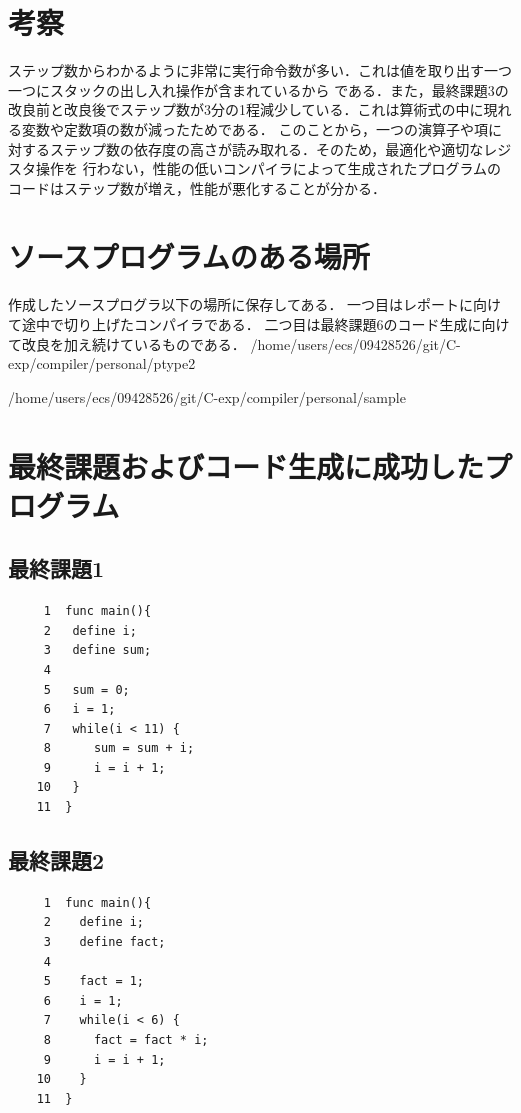 \documentclass[a4paper,11pt]{jarticle}
\begin{document}
{\begin{verbatim}
\end{verbatim}
\section{考察}
ステップ数からわかるように非常に実行命令数が多い．これは値を取り出す一つ一つにスタックの出し入れ操作が含まれているから
である．また，最終課題3の改良前と改良後でステップ数が3分の1程減少している．これは算術式の中に現れる変数や定数項の数が減ったためである．
このことから，一つの演算子や項に対するステップ数の依存度の高さが読み取れる．そのため，最適化や適切なレジスタ操作を
行わない，性能の低いコンパイラによって生成されたプログラムのコードはステップ数が増え，性能が悪化することが分かる．


\section{ソースプログラムのある場所}

作成したソースプログラ以下の場所に保存してある．
一つ目はレポートに向けて途中で切り上げたコンパイラである．
二つ目は最終課題6のコード生成に向けて改良を加え続けているものである．
/home/users/ecs/09428526/git/C-exp/compiler/personal/ptype2

/home/users/ecs/09428526/git/C-exp/compiler/personal/sample

\section{最終課題およびコード生成に成功したプログラム}
\subsection{最終課題1}
{\fontsize{10pt}{11pt} \selectfont
\begin{verbatim}
     1	func main(){
     2	 define i; 
     3	 define sum;
     4	
     5	 sum = 0;
     6	 i = 1;
     7	 while(i < 11) {
     8	    sum = sum + i;
     9	    i = i + 1;
    10	 }
    11	}
\end{verbatim}
}
\subsection{最終課題2}
{\fontsize{10pt}{11pt} \selectfont
\begin{verbatim}
     1	func main(){
     2	  define i;
     3	  define fact;
     4	  
     5	  fact = 1;
     6	  i = 1;
     7	  while(i < 6) {
     8	    fact = fact * i;
     9	    i = i + 1;
    10	  }
    11	}
\end{verbatim}
}
}
\end{document}

